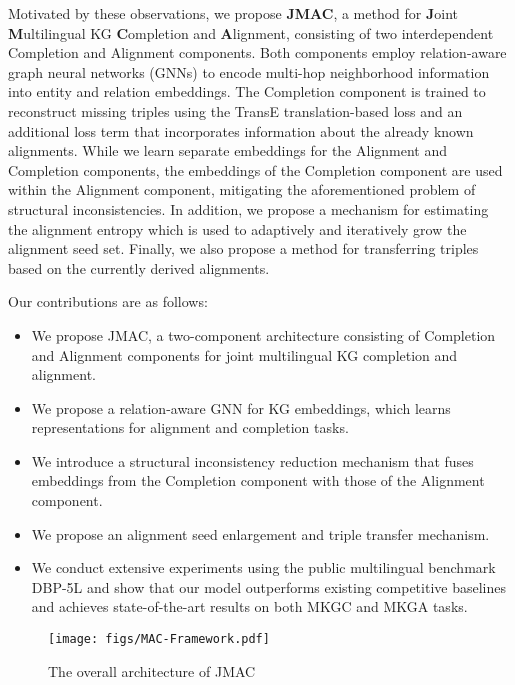 \documentclass[11pt]{article}
\begin{document}
Motivated by these observations, we propose \textbf{JMAC}, a method for \textbf{J}oint \textbf{M}ultilingual KG \textbf{C}ompletion and \textbf{A}lignment, consisting of two interdependent Completion and Alignment components. 
Both components employ relation-aware graph neural networks (GNNs) to encode multi-hop neighborhood information into entity and relation embeddings. The Completion component is trained to reconstruct missing triples using the TransE translation-based loss \cite{bordes2013translating} and an additional loss term that incorporates information about the already known alignments. While we learn separate  embeddings for the Alignment and Completion components, the embeddings of the Completion component are used within the Alignment component, mitigating the aforementioned problem of structural inconsistencies. In addition, we propose a mechanism for estimating the alignment entropy which is used to adaptively and iteratively grow the alignment seed set. Finally, we also propose a method for transferring triples based on the currently derived alignments.

Our contributions are as follows: 

\begin{itemize}
\item We propose JMAC, a two-component architecture consisting of Completion and Alignment components for joint multilingual KG completion and alignment.

\item We propose a relation-aware GNN for KG embeddings, which learns representations for alignment and completion tasks. 

\item We introduce a structural inconsistency reduction mechanism that fuses embeddings from the Completion component with those of the Alignment component.

\item We propose an alignment seed enlargement and triple transfer mechanism.

\item We conduct extensive experiments using  the public multilingual benchmark DBP-5L \cite{chen2020multilingual} and show that our model outperforms existing competitive baselines and achieves  state-of-the-art results on both MKGC and MKGA tasks.
\end{itemize}


\begin{figure*}[!t]
	\centering
	\texttt{[image: figs/MAC-Framework.pdf]}
    \caption{The overall architecture of JMAC}
    \label{fig:framework}
 \end{figure*}
 
\end{document}
